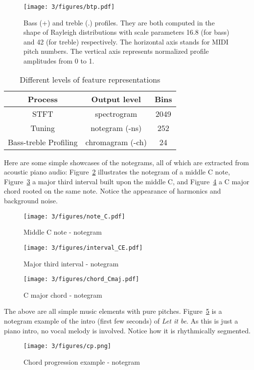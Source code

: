 \begin{figure}[htb]
\centering
\texttt{[image: 3/figures/btp.pdf]}
\caption{Bass (+) and treble (.) profiles. They are both computed in the shape of Rayleigh distributions with scale parameters 16.8 (for bass) and 42 (for treble) respectively. The horizontal axis stands for MIDI pitch numbers. The vertical axis represents normalized profile amplitudes from 0 to 1.}
\label{fig:3-btprofile}
\end{figure}

\begin{table}[htb]
\caption{Different levels of feature representations}
\centering
\footnotesize
\begin{tabular}{|c|c|c|} \hline
 Process & Output level & Bins \\ \hline
 STFT & spectrogram & 2049 \\ \hline
 Tuning & notegram (-ns) & 252 \\ \hline
 Bass-treble Profiling & chromagram (-ch) & 24 \\ \hline
\end{tabular}
\label{tab:3-felevels}
\end{table}

Here are some simple showcases of the notegrams, all of which are extracted from acoustic piano audio: Figure~\ref{fig:3-note_C} illustrates the notegram of a middle C note, Figure~\ref{fig:3-interval_CE} a major third interval built upon the middle C, and Figure~\ref{fig:3-chord_Cmaj} a C major chord rooted on the same note. Notice the appearance of harmonics and background noise.

\begin{figure}
\centering
\texttt{[image: 3/figures/note\_C.pdf]}
\caption{Middle C note - notegram}
\label{fig:3-note_C}
\end{figure}

\begin{figure}
\centering
\texttt{[image: 3/figures/interval\_CE.pdf]}
\caption{Major third interval - notegram}
\label{fig:3-interval_CE}
\end{figure}

\begin{figure}
\centering
\texttt{[image: 3/figures/chord\_Cmaj.pdf]}
\caption{C major chord - notegram}
\label{fig:3-chord_Cmaj}
\end{figure}

The above are all simple music elements with pure pitches. Figure~\ref{fig:3-cp} is a notegram example of the intro (first few seconds) of {\it Let it be}. As this is just a piano intro, no vocal melody is involved. Notice how it is rhythmically segmented.
\begin{figure}
\centering
\texttt{[image: 3/figures/cp.png]}
\caption{Chord progression example - notegram}
\label{fig:3-cp}
\end{figure}

